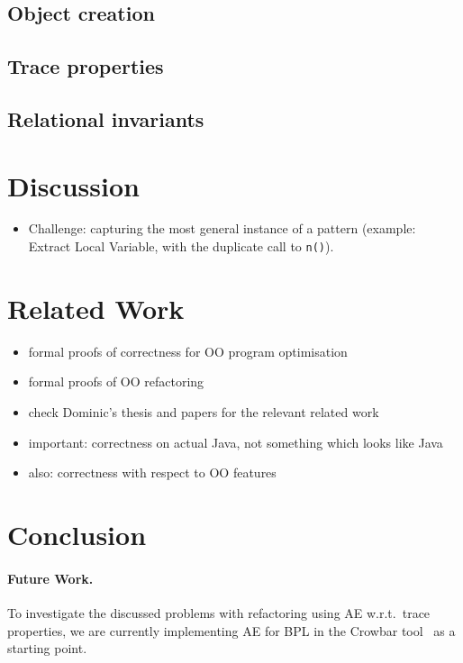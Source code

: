\documentclass[runningheads]{llncs}
\begin{document}

\subsection{Object creation}\label{sec:objectcreation}


\subsection{Trace properties}


\subsection{Relational invariants}


\section{Discussion}\label{sec:discussion}
\begin{itemize}
\item Challenge: capturing the most general instance of a pattern (example: Extract Local Variable, with the duplicate call to \texttt{n()}).
\end{itemize}

\section{Related Work}\label{sec:related}


\begin{itemize}
\item formal proofs of correctness for OO program optimisation
\item formal proofs of OO refactoring
\item check Dominic's thesis and papers for the relevant related work
\item important: correctness on actual Java, not something which looks like Java
\item also: correctness with respect to OO features
\end{itemize}

\section{Conclusion}\label{sec:conclusion}


\paragraph{Future Work.} 
To investigate the discussed problems with refactoring using AE w.r.t.\ trace properties, we are currently implementing AE for BPL in the Crowbar tool~\cite{crowbar} as a starting point.
\end{document}
